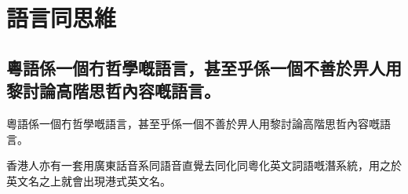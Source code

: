 \chapter{語言同思維}

\section{粵語係一個冇哲學嘅語言，甚至乎係一個不善於畀人用黎討論高階思哲內容嘅語言。}
粵語係一個冇哲學嘅語言，甚至乎係一個不善於畀人用黎討論高階思哲內容嘅語言。


香港人亦有一套用廣東話音系同語音直覺去同化同粵化英文詞語嘅潛系統，用之於英文名之上就會出現港式英文名。

